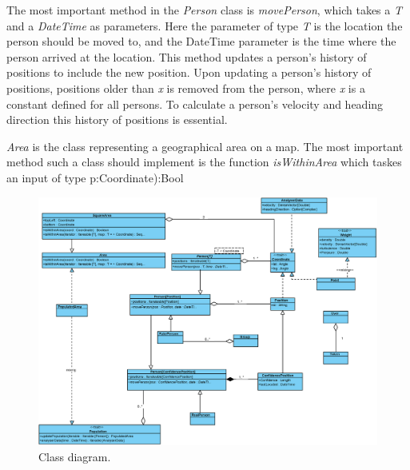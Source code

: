 The most important method in the \emph{Person} class is \emph{movePerson}, which takes a \emph{T} and a \emph{DateTime} as parameters. Here the parameter of type \emph{T} is the location the person should be moved to, and the DateTime parameter is the time where the person arrived at the location. This method updates a person's history of positions to include the new position. Upon updating a person's history of positions, positions older than \emph{x} is removed from the person, where \emph{x} is a constant defined for all persons. To calculate a person's velocity and heading direction this history of positions is essential. 

\emph{Area} is the class representing a geographical area on a map. The most important method such a class should implement is the function \emph{isWithinArea} which taskes an input of type p:Coordinate):Bool

\begin{figure}
\centering
\includegraphics[width=\linewidth]{figures/class.eps}
\caption{Class diagram.}
\label{fig:class}
\end{figure}
